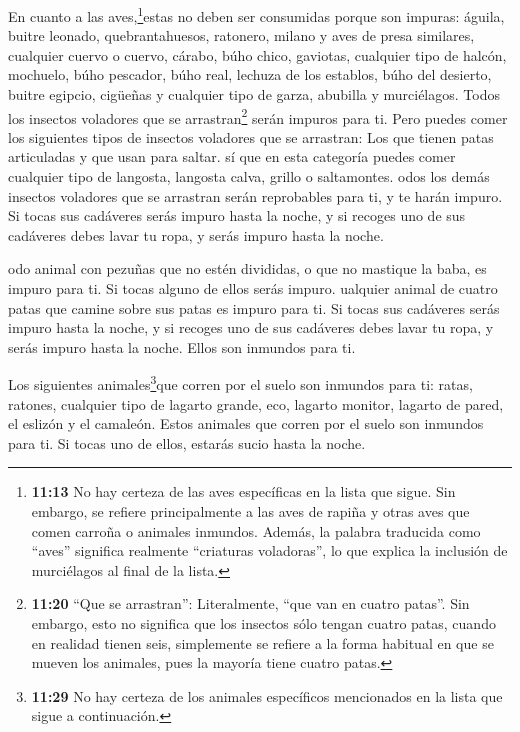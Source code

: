  En cuanto a las aves,\footnote{\textbf{11:13} No hay
  certeza de las aves específicas en la lista que sigue. Sin embargo, se
  refiere principalmente a las aves de rapiña y otras aves que comen
  carroña o animales inmundos. Además, la palabra traducida como
  ``aves'' significa realmente ``criaturas voladoras'', lo que explica
  la inclusión de murciélagos al final de la lista.}estas no deben ser
consumidas porque son impuras: águila, buitre leonado, quebrantahuesos,
 ratonero, milano y aves de presa similares, 
cualquier cuervo o cuervo,  cárabo, búho chico, gaviotas,
cualquier tipo de halcón,  mochuelo, búho pescador, búho
real,  lechuza de los establos, búho del desierto, buitre
egipcio,  cigüeñas y cualquier tipo de garza, abubilla y
murciélagos.  Todos los insectos voladores que se
arrastran\footnote{\textbf{11:20} ``Que se arrastran'': Literalmente,
  ``que van en cuatro patas''. Sin embargo, esto no significa que los
  insectos sólo tengan cuatro patas, cuando en realidad tienen seis,
  simplemente se refiere a la forma habitual en que se mueven los
  animales, pues la mayoría tiene cuatro patas.} serán impuros para ti.
 Pero puedes comer los siguientes tipos de insectos
voladores que se arrastran: Los que tienen patas articuladas y que usan
para saltar.  sí que en esta categoría puedes comer
cualquier tipo de langosta, langosta calva, grillo o saltamontes.
 odos los demás insectos voladores que se arrastran serán
reprobables para ti,  y te harán impuro. Si tocas sus
cadáveres serás impuro hasta la noche,  y si recoges uno de
sus cadáveres debes lavar tu ropa, y serás impuro hasta la noche.

 odo animal con pezuñas que no estén divididas, o que no
mastique la baba, es impuro para ti. Si tocas alguno de ellos serás
impuro.  ualquier animal de cuatro patas que camine sobre
sus patas es impuro para ti. Si tocas sus cadáveres serás impuro hasta
la noche,  y si recoges uno de sus cadáveres debes lavar tu
ropa, y serás impuro hasta la noche. Ellos son inmundos para ti.

 Los siguientes animales\footnote{\textbf{11:29} No hay
  certeza de los animales específicos mencionados en la lista que sigue
  a continuación.}que corren por el suelo son inmundos para ti: ratas,
ratones, cualquier tipo de lagarto grande,  eco, lagarto
monitor, lagarto de pared, el eslizón y el camaleón.  Estos
animales que corren por el suelo son inmundos para ti. Si tocas uno de
ellos, estarás sucio hasta la noche.

